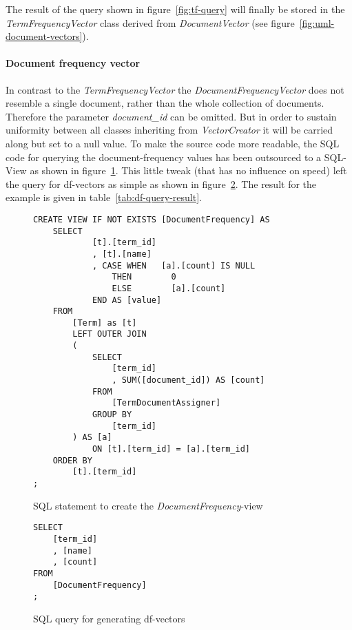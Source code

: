 \noindent
The result of the query shown in figure~\ref{fig:tf-query} will finally be stored in the \textit{TermFrequencyVector} class derived from \textit{DocumentVector} (see figure~\ref{fig:uml-document-vectors}).

\paragraph{Document frequency vector}
In contrast to the \textit{TermFrequencyVector} the \textit{DocumentFrequencyVector} does not resemble a single document, rather than the whole collection of documents.
Therefore the parameter \textit{document\_id} can be omitted.
But in order to sustain uniformity between all classes inheriting from \textit{VectorCreator} it will be carried along but set to a null value.
To make the source code more readable, the SQL code for querying the document-frequency values has been outsourced to a SQL-View as shown in figure~\ref{fig:df-view}.
This little tweak (that has no influence on speed) left the query for df-vectors as simple as shown in figure~\ref{fig:df-query}.
The result for the example is given in table~\ref{tab:df-query-result}.

\begin{figure}[h]
    \lstset{language=SQL}
    \begin{lstlisting}
CREATE VIEW IF NOT EXISTS [DocumentFrequency] AS
    SELECT
            [t].[term_id]
            , [t].[name]
            , CASE WHEN   [a].[count] IS NULL
                THEN        0
                ELSE        [a].[count]
            END AS [value]
    FROM
        [Term] as [t]
        LEFT OUTER JOIN
        (
            SELECT
                [term_id]
                , SUM([document_id]) AS [count]
            FROM
                [TermDocumentAssigner]
            GROUP BY
                [term_id]
        ) AS [a]
            ON [t].[term_id] = [a].[term_id]
    ORDER BY
        [t].[term_id]
;
    \end{lstlisting}
    \caption{SQL statement to create the \textit{DocumentFrequency}-view}
    \label{fig:df-view}
\end{figure}

\begin{figure}[h]
    \lstset{language=SQL}
    \begin{lstlisting}
SELECT
    [term_id]
    , [name]
    , [count]
FROM
    [DocumentFrequency]
;
    \end{lstlisting}
    \caption{SQL query for generating df-vectors}
    \label{fig:df-query}
\end{figure}


